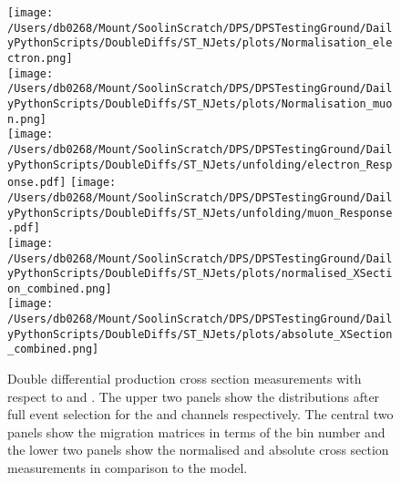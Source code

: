 \begin{figure}[htpb]
	\centering
	\texttt{[image: /Users/db0268/Mount/SoolinScratch/DPS/DPSTestingGround/DailyPythonScripts/DoubleDiffs/ST\_NJets/plots/Normalisation\_electron.png]} \\
	\texttt{[image: /Users/db0268/Mount/SoolinScratch/DPS/DPSTestingGround/DailyPythonScripts/DoubleDiffs/ST\_NJets/plots/Normalisation\_muon.png]} \\
	\vspace{0.8cm}
	\texttt{[image: /Users/db0268/Mount/SoolinScratch/DPS/DPSTestingGround/DailyPythonScripts/DoubleDiffs/ST\_NJets/unfolding/electron\_Response.pdf]}
	\texttt{[image: /Users/db0268/Mount/SoolinScratch/DPS/DPSTestingGround/DailyPythonScripts/DoubleDiffs/ST\_NJets/unfolding/muon\_Response.pdf]} \\
	\vspace{0.8cm}
	\texttt{[image: /Users/db0268/Mount/SoolinScratch/DPS/DPSTestingGround/DailyPythonScripts/DoubleDiffs/ST\_NJets/plots/normalised\_XSection\_combined.png]} \\
	\texttt{[image: /Users/db0268/Mount/SoolinScratch/DPS/DPSTestingGround/DailyPythonScripts/DoubleDiffs/ST\_NJets/plots/absolute\_XSection\_combined.png]} \\
	\vspace{0.4cm}
	\caption[Double differential \ttbar{} production cross section measurements with respect to \ST{} and \NJET{}. The upper two panels show the distributions after full event selection for the \eJets{} and \muJets{} channels respectively. The central two panels show the migration matrices in terms of the bin number and the lower two panels show the normalised and absolute cross section measurements in comparison to the \powhegpythia{} model.]{Double differential \ttbar{} production cross section measurements with respect to \ST{} and \NJET{}. The upper two panels show the distributions after full event selection for the \eJets{} and \muJets{} channels respectively. The central two panels show the migration matrices in terms of the bin number and the lower two panels show the normalised and absolute cross section measurements in comparison to the \powhegpythia{} model.}
	\label{fig:ST_NJET}
\end{figure}

